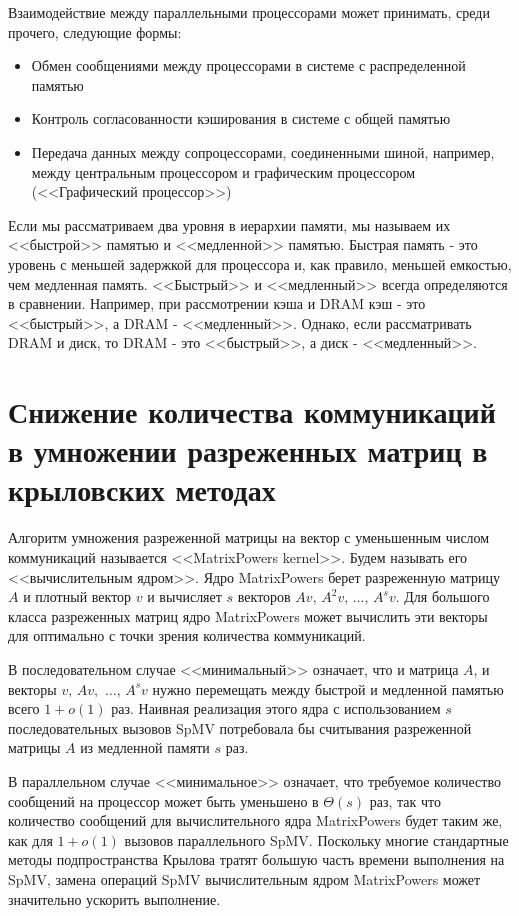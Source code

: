 \documentclass[a4paper,12pt]{report}
\begin{document}
    Взаимодействие между параллельными процессорами может принимать, среди прочего, следующие формы: 
    \begin{itemize}
        \item Обмен сообщениями между процессорами в системе с распределенной памятью
        \item Контроль согласованности кэширования в системе с общей памятью
        \item Передача данных между сопроцессорами, соединенными шиной, например, между центральным процессором и графическим процессором (<<Графический процессор>>)
    \end{itemize}

    Если мы рассматриваем два уровня в иерархии памяти, мы называем их <<быстрой>> памятью и <<медленной>> памятью. Быстрая память - это уровень с меньшей задержкой для процессора и, как правило, меньшей емкостью, чем медленная память. <<Быстрый>> и <<медленный>> всегда определяются в сравнении. Например, при рассмотрении кэша и DRAM кэш - это <<быстрый>>, а DRAM - <<медленный>>. Однако, если рассматривать DRAM и диск, то DRAM - это <<быстрый>>, а диск - <<медленный>>.
    
    \chapter{ Снижение количества коммуникаций в умножении разреженных матриц в крыловских методах}
    Алгоритм умножения разреженной матрицы на вектор с уменьшенным числом коммуникаций называется <<MatrixPowers kernel>>. Будем называть его <<вычислительным ядром>>. Ядро MatrixPowers берет разреженную матрицу $A$ и плотный вектор $v$ и вычисляет $s$ векторов $Av,\, A^2v,\, \ldots,\, A^s v$. Для большого класса разреженных матриц ядро MatrixPowers может вычислить эти векторы для оптимально с точки зрения количества коммуникаций.
    
    В последовательном случае <<минимальный>> означает, что и матрица $A$, и векторы $v,\, Av,$ $\ldots,\, A^sv$ нужно перемещать между быстрой и медленной памятью всего $1 + o(1)$ раз. Наивная реализация этого ядра с использованием $s$ последовательных вызовов SpMV потребовала бы считывания разреженной матрицы $A$ из медленной памяти $s$ раз. 
    
    В параллельном случае <<минимальное>> означает, что требуемое количество сообщений на процессор может быть уменьшено в $\Theta(s)$ раз, так что количество сообщений для вычислительного ядра MatrixPowers будет таким же, как для $1 + o(1)$ вызовов параллельного SpMV. Поскольку многие стандартные методы подпространства Крылова тратят большую часть времени выполнения на SpMV, замена операций SpMV вычислительным ядром MatrixPowers может значительно ускорить выполнение.
\end{document}
